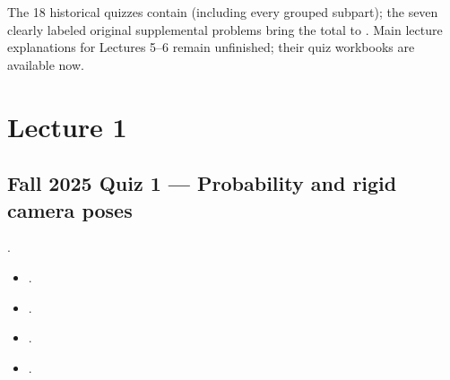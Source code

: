 \documentclass[letterpaper,11pt,english,openany,oneside]{jupyterBook}
\begin{document}
\sphinxAtStartPar
The 18 historical quizzes contain  (including every grouped subpart); the seven clearly labeled original supplemental problems bring the total to . Main lecture explanations for Lectures 5–6 remain unfinished; their quiz workbooks are available now.


\section{Lecture 1}
\label{\detokenize{reference/quiz-index:lecture-1}}
\sphinxAtStartPar
{}


\subsection{Fall 2025 Quiz 1 — Probability and rigid camera poses}
\label{\detokenize{reference/quiz-index:fall-2025-quiz-1-probability-and-rigid-camera-poses}}
\sphinxAtStartPar
{} .
\begin{itemize}
\item {}
\sphinxAtStartPar
{\hyperref[\detokenize{lectures/lecture01/quiz-workbook:quiz-17-q1}]{}}.

\item {}
\sphinxAtStartPar
{\hyperref[\detokenize{lectures/lecture01/quiz-workbook:quiz-17-q2}]{}}.

\item {}
\sphinxAtStartPar
{\hyperref[\detokenize{lectures/lecture01/quiz-workbook:quiz-17-q3}]{}}.

\item {}
\sphinxAtStartPar
{\hyperref[\detokenize{lectures/lecture01/quiz-workbook:quiz-17-q4}]{}}.

\end{itemize}
\end{document}
